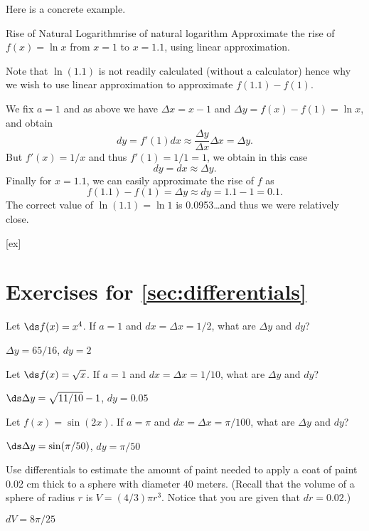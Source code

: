 Here is a concrete example.

\begin{example}{Rise of Natural Logarithm}{rise of natural logarithm}
Approximate the rise of $f(x)=\ln x$ from $x=1$ to $x=1.1$, using linear approximation.
\end{example}

\begin{solution}
Note that $\ln (1.1)$ is not readily calculated (without a calculator) hence why we wish to use linear approximation to approximate $f(1.1)-f(1)$.

We fix $a=1$ and as above we have $\Delta x=x-1$ and $\Delta y=f(x)-f(1)=\ln x$, and obtain
\[ dy=f'(1)dx\approx \frac{\Delta y}{\Delta x}\Delta x=\Delta y. \]
But $f'(x)=1/x$ and thus $f'(1)=1/1=1$, we obtain in this case
\[ dy=dx\approx\Delta y. \]
Finally for $x=1.1$, we can easily approximate the rise of $f$ as
\[ f(1.1)-f(1)=\Delta y\approx dy=1.1-1=0.1. \]
The correct value of $\ln (1.1)=\ln 1$ is 0.0953\ldots and thus we were relatively close.
\end{solution}


[ex]
\section*{Exercises for \ref{sec:differentials}}

\begin{enumialphparenastyle}
	
\begin{ex} 
Let $\ds f(x) = x^4$. If $a=1$ and $dx= \Delta x =1/2$, 
what are $\Delta y$ and $dy$?
\begin{sol}
	$\Delta y=65/16$, $dy=2$
\end{sol}
\end{ex}

\begin{ex} 
Let $\ds f(x) = \sqrt{x}$. If $a=1$ and $dx= \Delta x
=1/10$, what are $\Delta y$ and $dy$?
\begin{sol}
	$\ds \Delta y=\sqrt{11/10}-1$, $dy=0.05$
\end{sol}
\end{ex}

\begin{ex} 
Let $f(x) = \sin (2x)$. If $a=\pi$ and $dx= \Delta x
=\pi/100$, what are $\Delta y$ and $dy$?
\begin{sol}
	$\ds \Delta y=\sin(\pi/50)$, $dy=\pi/50$
\end{sol}
\end{ex}

\begin{ex} 
Use differentials to estimate the amount of paint needed to
 apply a coat of paint 0.02 cm thick to a sphere with diameter $40$
 meters. (Recall that the volume of a sphere of radius $r$ is $V
 =(4/3)\pi r^3$. Notice that you are given that $dr=0.02$.)
\begin{sol}
	$dV=8\pi/25$
\end{sol}
\end{ex}

\end{enumialphparenastyle}